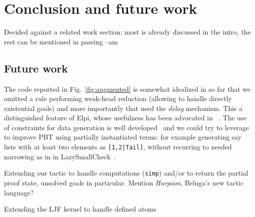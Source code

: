 \section{Conclusion and future work}


\begin{metanote}
  Decided against a related work section: most is already discussed in the intro, the rest can be mentioned in passing --am
\end{metanote}


\subsection{Future work}
\label{ssec:fut}

The code reported in Fig.~\ref{fig:augmented} is somewhat idealized in
so far that we omitted a rule performing weak-head reduction (allowing
to handle directly existential goals) and more importantly that used
the \emph{delay} mechanism. This a distinguished feature of Elpi, whose
usefulness has been advocated in ~\cite{DunchevCT16,coen19mscs}.  The
use of constraints for data generation is well
developed~\cite{FioravantiPS15} and we could try to leverage to
improve PBT using partially instantiated terms: for example generating
say lists with at least two elements as \texttt{[1,2|Tail]}, without
recurring to needed narrowing as in in
LazySmallCheck~\cite{smallcheck}.

Extending our tactic to handle computations (\texttt{simp}) and/or to return the partial proof state, unsolved goals in particular. Mention \emph{Harpoon}, Beluga's new tactic language?

Extending the LJF kernel to handle defined atoms

